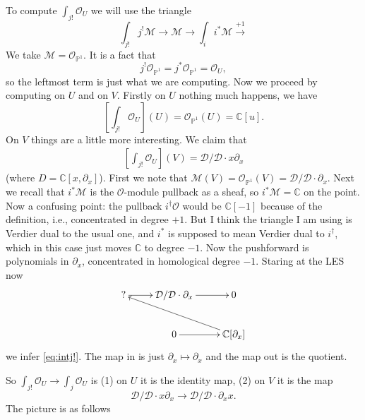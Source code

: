 \documentclass[12pt]{article}
\theoremstyle{plain}
\theoremstyle{definition}
\numberwithin{equation}{section}
\newcommand{\C}{\mathbb{C}}
\newcommand{\bbP}{\mathbb{P}}
\newcommand{\CD}{\mathcal{D}}
\newcommand{\OO}{\mathcal{O}}
\newcommand{\CM}{\mathcal{M}}
\begin{document}
To compute $\int_{j!} \OO_U$ we will use the triangle
\[
\int_{j!} j^! \CM \rightarrow \CM \rightarrow \int_i i^* \CM \xrightarrow{+1}
\]
We take $\CM = \OO_{\bbP^1}$. It is a fact that
\[
j^! \OO_{\bbP^1} = j^* \OO_{\bbP^1} = \OO_U,
\]
so the leftmost term is just what we are computing. Now we proceed by computing on $U$ and on $V$. Firstly on $U$ nothing much happens, we have
\[
[\int_{j!}\OO_U](U) = \OO_{\bbP^1}(U) = \C[u].
\]
On $V$ things are a little more interesting. We claim that
\begin{align}\label{eq:intj!}
[\int_{j!}\OO_U](V) = \CD / \CD \cdot x \partial_x
\end{align}
(where $D = \C[x, \partial_x]$). First we note that $\CM(V) = \OO_{\bbP^1}(V) = \CD / \CD \cdot \partial_x$. Next we recall that $i^* \CM$ is the $\OO$-module pullback as a sheaf, so $i^* \CM = \C$ on the point. {\color{red}Now a confusing point: the pullback $i^\dagger \OO$ would be $\C[-1]$ because of the definition, i.e., concentrated in degree $+1$. But I think the triangle I am using is Verdier dual to the usual one, and $i^*$ is supposed to mean Verdier dual to $i^\dagger$, which in this case just moves $\C$ to degree $-1$.} Now the pushforward is polynomials in $\partial_x$, concentrated in homological degree $-1$. Staring at the LES now
\begin{align*}
\xymatrix{
? \ar@{->}[r] & \CD / \CD \cdot \partial_x \ar@{->}[r] & 0 \\
%
 & 0 \ar@{->}[r] & \C[\partial_x] \ar@{->}[ull] \\
}
\end{align*}
we infer \eqref{eq:intj!}. The map in is just $\partial_x \mapsto \partial_x$ and the map out is the quotient.

So $\int_{j!} \OO_U \rightarrow \int_j \OO_U$ is (1) on $U$ it is the identity map, (2) on $V$ it is the map
\[
\CD / \CD \cdot x \partial_x \rightarrow \CD / \CD \cdot \partial_x x.
\]
The picture is as follows
\end{document}
